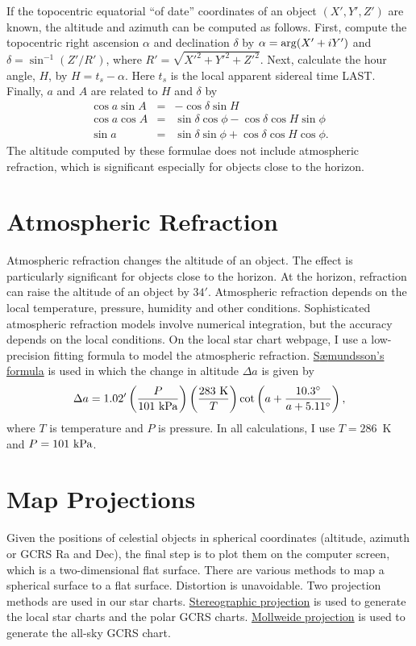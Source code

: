 \documentclass[12pt]{article}
\newcommand \beq {\begin{equation}}
\newcommand \eeq {\end{equation}}
\newcommand \beqn {\begin{eqnarray}}
\newcommand \eeqn {\end{eqnarray}}
\begin{document}
If the topocentric equatorial ``of date'' coordinates of an object $(X',Y',Z')$ 
are known, the altitude and azimuth can be computed as follows. First, compute the 
topocentric right ascension $\alpha$ and declination $\delta$ by 
$\alpha = {\rm arg}(X' + i Y')$ and $\delta = \sin^{-1}(Z'/R')$, where 
$R'=\sqrt{X'^2+Y'^2+Z'^2}$.
Next, calculate the hour angle, $H$, by $H=t_s-\alpha$. Here $t_s$ 
is the local apparent sidereal time LAST. 
Finally, $a$ and $A$ are related to $H$ and $\delta$ by 
\beqn
  \cos a \sin A &=& -\cos \delta \sin H \label{eq:aAFromHdel1} \\
  \cos a \cos A &=& \sin \delta \cos \phi - \cos \delta \cos H \sin \phi 
\label{eq:aAFromHdel2} \\
  \sin a &=& \sin \delta \sin \phi + \cos \delta \cos H \cos \phi .
\label{eq:aAFromHdel3}
\eeqn
The altitude computed by these formulae does not include atmospheric refraction, 
which is significant especially for objects close to the horizon.

\section{Atmospheric Refraction}

Atmospheric refraction changes the altitude of an object. The effect is particularly 
significant for objects close to the horizon. At the horizon, refraction 
can raise the altitude of an object by $34'$. Atmospheric refraction 
depends on the local temperature, pressure, humidity and other conditions. 
Sophisticated atmospheric refraction models involve numerical integration, 
but the accuracy depends on the local conditions.
On the local star chart webpage, I use a low-precision fitting formula 
to model the atmospheric refraction. 
\href{https://en.wikipedia.org/wiki/Atmospheric_refraction#cite_note-Saemundsson1986-24}{S{\ae}mundsson's formula} 
is used in which the change in altitude $\Delta a$ is given by 
\beq
  \Delta a = 1.02' \left(\frac{P}{101~{\rm kPa}}\right) 
\left( \frac{283~{\rm K}}{T}\right)  
\cot \left(a + \frac{10.3^\circ}{a + 5.11^\circ}\right) ,
\label{eq:atmRefraction}
\eeq
where $T$ is temperature and $P$ is pressure. In all calculations, 
I use $T=286$~K and $P=101~{\rm kPa}$.

\section{Map Projections}
\label{sec:maps}

Given the positions of celestial objects in spherical coordinates (altitude, 
azimuth or GCRS Ra and Dec), the final step is to plot them on the computer 
screen, which is a two-dimensional flat surface. There are various methods 
to map a spherical surface to a flat surface. Distortion is unavoidable. 
Two projection methods are used in our star charts. 
\href{https://en.wikipedia.org/wiki/Stereographic_projection}{Stereographic projection} 
is used to generate the local star charts and the polar GCRS charts. 
\href{https://en.wikipedia.org/wiki/Mollweide_projection}{Mollweide projection} 
is used to generate the all-sky GCRS chart. 
\end{document}
